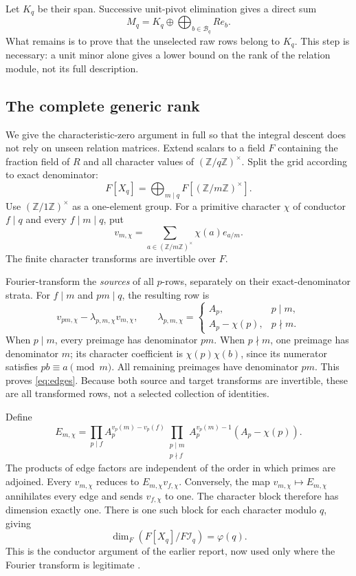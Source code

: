\documentclass[11pt]{article}
\numberwithin{equation}{section}
\theoremstyle{definition}
\theoremstyle{remark}
\newcommand{\Z}{\mathbb Z}
\newcommand{\I}{\mathcal I}
\newcommand{\B}{\mathcal B}
\begin{document}
Let $K_q$ be their span. Successive unit-pivot elimination gives a direct
sum
\begin{equation}
 M_q=K_q\oplus \bigoplus_{b\in\B_q}Re_b.
 \label{eq:split-selected}
\end{equation}
What remains is to prove that the unselected raw rows belong to $K_q$.
This step is necessary: a unit minor alone gives a lower bound on the
rank of the relation module, not its full description.

\subsection{The complete generic rank}
We give the characteristic-zero argument in full so that the integral
descent does not rely on unseen relation matrices. Extend scalars to a
field $F$ containing the fraction field of $R$ and all character values
of $(\Z/q\Z)^\times$. Split the grid according to exact denominator:
\[
 F[X_q]=\bigoplus_{m\mid q}F[(\Z/m\Z)^\times].
\]
Use $(\Z/1\Z)^\times$ as a one-element group. For a primitive character
$\chi$ of conductor $f\mid q$ and every $f\mid m\mid q$, put
\[
 v_{m,\chi}=\sum_{a\in(\Z/m\Z)^\times}\chi(a)e_{a/m}.
\]
The finite character transforms are invertible over $F$.

Fourier-transform the \emph{sources} of all $p$-rows, separately on their
exact-denominator strata. For $f\mid m$ and $pm\mid q$, the resulting
row is
\begin{equation}
 v_{pm,\chi}-\lambda_{p,m,\chi}v_{m,\chi},\qquad
 \lambda_{p,m,\chi}=\begin{cases}
 A_p,&p\mid m,\\ A_p-\chi(p),&p\nmid m.
 \end{cases}
 \label{eq:edges}
\end{equation}
When $p\mid m$, every preimage has denominator $pm$. When $p\nmid m$,
one preimage has denominator $m$; its character coefficient is
$\chi(p)\chi(b)$, since its numerator satisfies $pb\equiv a\pmod m$.
All remaining preimages have denominator $pm$. This proves
\eqref{eq:edges}. Because both source and target transforms are invertible,
these are all transformed rows, not a selected collection of identities.

Define
\begin{equation}
 E_{m,\chi}=
 \prod_{p\mid f}A_p^{v_p(m)-v_p(f)}
 \prod_{\substack{p\mid m\\p\nmid f}}
 A_p^{v_p(m)-1}(A_p-\chi(p)).
 \label{eq:conductor}
\end{equation}
The products of edge factors are independent of the order in which
primes are adjoined. Every $v_{m,\chi}$ reduces to
$E_{m,\chi}v_{f,\chi}$. Conversely, the map
$v_{m,\chi}\mapsto E_{m,\chi}$ annihilates every edge and sends
$v_{f,\chi}$ to one. The character block therefore has dimension exactly
one. There is one such block for each character modulo $q$, giving
\begin{equation}
 \dim_F(F[X_q]/F\I_q)=\varphi(q).
 \label{eq:generic-rank}
\end{equation}
This is the conductor argument of the earlier report, now used only
where the Fourier transform is legitimate \cite{repodistribution}.
\end{document}
